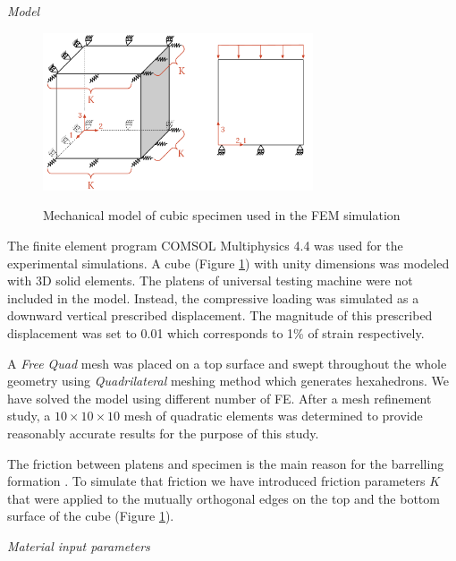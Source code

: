 \documentclass[review]{elsarticle}
\begin{document}
\begin{description}
\item{\textit{Model}}
\end{description}

\begin{figure}[h]
\centering
\includegraphics[width=8cm]{BarellingPaper.pdf}
\label{fig:Barrelling}
\caption{\label{fig:Barrelling} Mechanical model of cubic
specimen used in the FEM simulation}
\end{figure}



The finite element program COMSOL Multiphysics 4.4 \cite{Comsol} was used for
the experimental simulations.
A cube (Figure \ref{fig:Barrelling})  with unity dimensions was modeled with
3D solid elements.
The platens of universal testing machine were not included in the model.
Instead, the compressive loading was simulated as a downward vertical prescribed
displacement. The magnitude of this prescribed displacement was set to 0.01
which corresponds to  1\%  of  strain respectively.

A \textit{Free Quad} mesh was placed on a top surface and swept throughout
the whole geometry using \textit{Quadrilateral} meshing method which generates
hexahedrons. We have solved the model using different number of FE. 
After a mesh refinement study, a $10\times10\times10$ mesh of quadratic
elements was determined to provide reasonably accurate results for the purpose of this study.

The friction between platens and specimen is the main reason for the
barrelling formation \cite{Narayanasamy198821, kulkarni1969}. To simulate that
friction we have introduced friction parameters $K$ that were applied to the
mutually orthogonal edges on the top and the bottom surface of the cube (Figure
\ref{fig:Barrelling}).

\begin{description}
\item{\textit{Material input parameters}}
\end{description}
\end{document}
